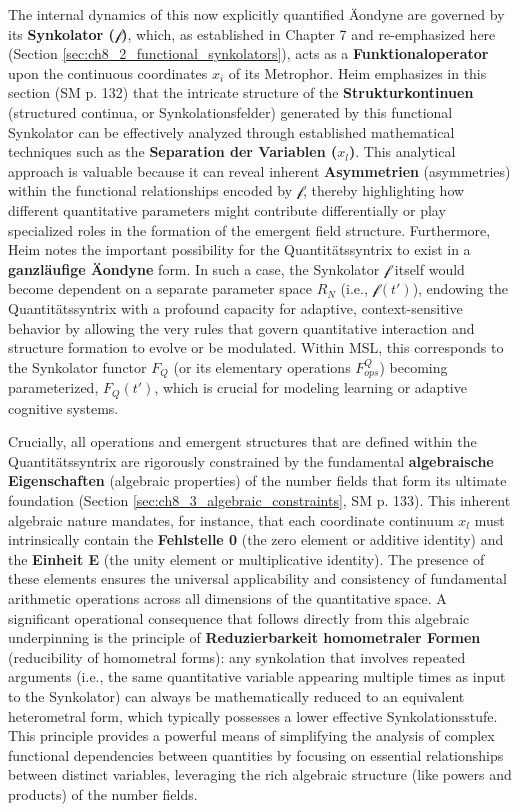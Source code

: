 \documentclass[
    12pt,              %
    a4paper,           %
    headings=normal,   %
    twoside=true,      %
    BCOR=8mm,          %
]{scrbook}
\newcommand{\funktionaloperator}{\mathcal{f}}
\begin{document}
The internal dynamics of this now explicitly quantified Äondyne are governed by its \textbf{Synkolator (\(\funktionaloperator\))}, which, as established in Chapter 7 and re-emphasized here (Section \ref{sec:ch8_2_functional_synkolators}), acts as a \textbf{Funktionaloperator} upon the continuous coordinates \(x_i\) of its Metrophor. Heim emphasizes in this section (SM p. 132) that the intricate structure of the \textbf{Strukturkontinuen} (structured continua, or Synkolationsfelder) generated by this functional Synkolator can be effectively analyzed through established mathematical techniques such as the \textbf{Separation der Variablen (\(x_l\))}. This analytical approach is valuable because it can reveal inherent \textbf{Asymmetrien} (asymmetries) within the functional relationships encoded by \(\funktionaloperator\), thereby highlighting how different quantitative parameters might contribute differentially or play specialized roles in the formation of the emergent field structure. Furthermore, Heim notes the important possibility for the Quantitätssyntrix to exist in a \textbf{ganzläufige Äondyne} form. In such a case, the Synkolator \(\funktionaloperator\) itself would become dependent on a separate parameter space \(R_N\) (i.e., \(\funktionaloperator(t')\)), endowing the Quantitätssyntrix with a profound capacity for adaptive, context-sensitive behavior by allowing the very rules that govern quantitative interaction and structure formation to evolve or be modulated. Within MSL, this corresponds to the Synkolator functor \(F_Q\) (or its elementary operations \(F_{ops}^Q\)) becoming parameterized, \(F_Q(t')\), which is crucial for modeling learning or adaptive cognitive systems.

Crucially, all operations and emergent structures that are defined within the Quantitätssyntrix are rigorously constrained by the fundamental \textbf{algebraische Eigenschaften} (algebraic properties) of the number fields that form its ultimate foundation (Section \ref{sec:ch8_3_algebraic_constraints}, SM p. 133). This inherent algebraic nature mandates, for instance, that each coordinate continuum \(x_l\) must intrinsically contain the \textbf{Fehlstelle 0} (the zero element or additive identity) and the \textbf{Einheit E} (the unity element or multiplicative identity). The presence of these elements ensures the universal applicability and consistency of fundamental arithmetic operations across all dimensions of the quantitative space. A significant operational consequence that follows directly from this algebraic underpinning is the principle of \textbf{Reduzierbarkeit homometraler Formen} (reducibility of homometral forms): any synkolation that involves repeated arguments (i.e., the same quantitative variable appearing multiple times as input to the Synkolator) can always be mathematically reduced to an equivalent heterometral form, which typically possesses a lower effective Synkolationsstufe. This principle provides a powerful means of simplifying the analysis of complex functional dependencies between quantities by focusing on essential relationships between distinct variables, leveraging the rich algebraic structure (like powers and products) of the number fields.
\end{document}
